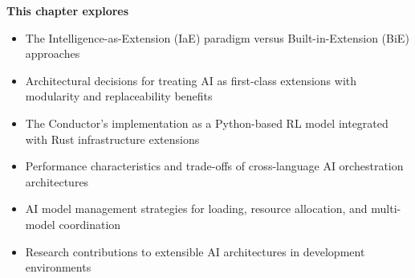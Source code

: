 \begin{tcolorbox}[
    enhanced,
    colback=white,
    colframe=brandPrimary!40,
    boxrule=1pt,
    arc=12pt,
    drop shadow={brandPrimary!20},
    left=1.5cm,
    right=1.5cm,
    top=1.2cm,
    bottom=1.2cm,
    before upper={\parindent0pt}
]
\begin{center}
{\Large\textbf{\textcolor{brandPrimary}{This chapter explores}}}
\end{center}

\vspace{0.8cm}

\begin{itemize}[leftmargin=1.2cm, itemsep=0.4cm, label={\textcolor{brandAccent}{$\triangleright$}}]
    \item {\large The Intelligence-as-Extension (IaE) paradigm versus Built-in-Extension (BiE) approaches}
    \item {\large Architectural decisions for treating AI as first-class extensions with modularity and replaceability benefits}
    \item {\large The Conductor's implementation as a Python-based RL model integrated with Rust infrastructure extensions}
    \item {\large Performance characteristics and trade-offs of cross-language AI orchestration architectures}
    \item {\large AI model management strategies for loading, resource allocation, and multi-model coordination}
    \item {\large Research contributions to extensible AI architectures in development environments}
\end{itemize}
\end{tcolorbox}

\clearpage
